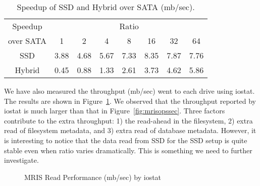 \begin{table}[tc]
{\centering \footnotesize
\begin{tabular}{c|c|c|c|c|c|c|c}
\hline 
  Speedup & \multicolumn{7}{c}{Ratio} \\ \cline{2-8}
  over SATA & 1 & 2 & 4 & 8 & 16 & 32 & 64 \\ \hline
  SSD & 3.88 & 4.68 & 5.67 & 7.33 & 8.35 & 7.87 & 7.76 \\
  Hybrid & 0.45 & 0.88 & 1.33 & 2.61 & 3.73 & 4.62 & 5.86 \\ \hline
\end{tabular}
 \caption{Speedup of SSD and Hybrid over SATA (mb/sec).}
\label{tbl:spdupmb}
}
\end{table}


We have also measured the throughput (mb/sec) went to each drive using
iostat. The results are shown in Figure~\ref{fig:mrisiostat}. We
observed that the throughput reported by iostat is much larger than
that in Figure~\ref{fig:mrisopssec}. Three factors contribute to the
extra throughput: 1) the read-ahead in the filesystem, 2) extra read
of filesystem metadata, and 3) extra read of database metadata.
However, it is interesting to notice that the data read from SSD for
the SSD setup is quite stable even when ratio varies dramatically.
This is something we need to further investigate.

\begin{figure}[t]
\begin{centering}
\caption{MRIS Read Performance (mb/sec) by iostat}
\label{fig:mrisiostat}
\end{centering}
\end{figure}

